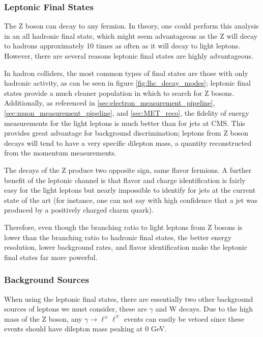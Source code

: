     \subsubsection{Leptonic Final States} \label{sec:leptonic_final_states}
      The Z boson can decay to any fermion. In theory, one could perform this analysis in an all hadronic final state, which might seem advantageous as the Z will decay to hadrons approximately 10 times as often as it will decay to light leptons.\cite{PDG} However, there are several reasons leptonic final states are highly advantageous.

      In hadron colliders, the most common types of final states are those with only hadronic activity, as can be seen in figure \ref{fig:lhc_decay_modes}; leptonic final states provide a much cleaner population in which to search for Z bosons. Additionally, as referenced in \ref{sec:electron_measurement_pipeline}, \ref{sec:muon_measurement_pipeline}, and \ref{sec:MET_reco}, the fidelity of energy measurements for the light leptons is much better than for jets at CMS. This provides great advantage for background discrimination; leptons from Z boson decays will tend to have a very specific dilepton mass, a quantity reconstructed from the momentum measurements.

      The decays of the Z produce two opposite sign, same flavor fermions. A further benefit of the leptonic channel is that flavor and charge identification is fairly easy for the light leptons but nearly impossible to identify for jets at the current state of the art (for instance, one can not say with high confidence that a jet was produced by a positively charged charm quark).

      Therefore, even though the branching ratio to light leptons from Z bosons is lower than the branching ratio to hadronic final states, the better energy resolution, lower background rates, and flavor identification make the leptonic final states far more powerful.

    \subsubsection{Background Sources}
      When using the leptonic final states, there are essentially two other background sources of leptons we must consider, these are $\gamma$ and W decays. Due to the high mass of the Z boson, any $\gamma \to \ell^\pm \ell^\mp$ events can easily be vetoed since these events should have dilepton mass peaking at 0 GeV. 

